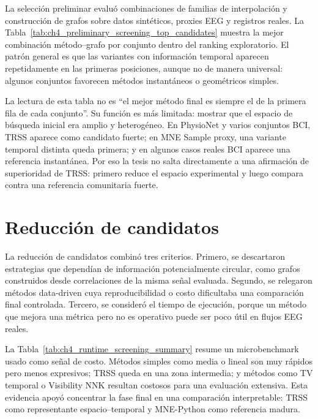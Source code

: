 La selección preliminar evaluó combinaciones de familias de interpolación y construcción de grafos sobre datos sintéticos, proxies EEG y registros reales. La Tabla~\ref{tab:ch4_preliminary_screening_top_candidates} muestra la mejor combinación método--grafo por conjunto dentro del ranking exploratorio. El patrón general es que las variantes con información temporal aparecen repetidamente en las primeras posiciones, aunque no de manera universal: algunos conjuntos favorecen métodos instantáneos o geométricos simples.



La lectura de esta tabla no es “el mejor método final es siempre el de la primera fila de cada conjunto”. Su función es más limitada: mostrar que el espacio de búsqueda inicial era amplio y heterogéneo. En PhysioNet y varios conjuntos BCI, TRSS aparece como candidato fuerte; en MNE Sample proxy, una variante temporal distinta queda primera; y en algunos casos reales BCI aparece una referencia instantánea. Por eso la tesis no salta directamente a una afirmación de superioridad de TRSS: primero reduce el espacio experimental y luego compara contra una referencia comunitaria fuerte.

\section{Reducción de candidatos}

La reducción de candidatos combinó tres criterios. Primero, se descartaron estrategias que dependían de información potencialmente circular, como grafos construidos desde correlaciones de la misma señal evaluada. Segundo, se relegaron métodos data-driven cuya reproducibilidad o costo dificultaba una comparación final controlada. Tercero, se consideró el tiempo de ejecución, porque un método que mejora una métrica pero no es operativo puede ser poco útil en flujos EEG reales.

La Tabla~\ref{tab:ch4_runtime_screening_summary} resume un microbenchmark usado como señal de costo. Métodos simples como media o lineal son muy rápidos pero menos expresivos; TRSS queda en una zona intermedia; y métodos como TV temporal o Visibility NNK resultan costosos para una evaluación extensiva. Esta evidencia apoyó concentrar la fase final en una comparación interpretable: TRSS como representante espacio--temporal y MNE-Python como referencia madura.



